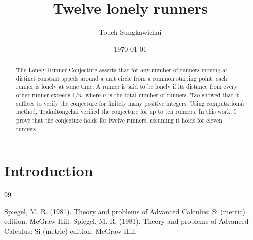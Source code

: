 \documentclass[10pt,leqno]{amsart}
\begin{document}
\title{Twelve lonely runners}
\author[T. Sungkawichai]{Touch Sungkawichai}
\date{\today}
\maketitle 


\begin{abstract}
  The Lonely Runner Conjecture asserts that for any number of runners moving at distinct constant speeds around a unit circle
  from a common starting point, each runner is lonely at some time. A runner is said to be lonely if its distance from every 
  other runner exceeds $1/n$, where $n$ is the total number of runners. 
  Tao\cite{Tao} showed that it suffices to verify the conjecture for finitely many positive integers. 
  Using computational method, Trakultongchai\cite{Tanupat} verified the conjecture for up to ten runners.
  In this work, I prove that the conjecture holds for twelve runners, assuming it holds for eleven runners.
\end{abstract}

\bigskip

\section*{Introduction}

\begin{thebibliography}{99}

 Spiegel, M. R. (1981). Theory and problems of Advanced Calculus: Si (metric) edition. McGraw-Hill. 
 Spiegel, M. R. (1981). Theory and problems of Advanced Calculus: Si (metric) edition. McGraw-Hill. 

\end{thebibliography}
\end{document}
